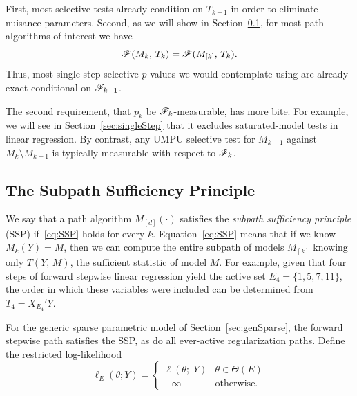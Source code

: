 \documentclass{article}
\begin{document}
First, most selective tests already condition on $T_{k-1}$ in order to eliminate nuisance parameters. Second, as we will show in Section~\ref{sec:SSP}, for most path algorithms of interest we have
\begin{equation}\label{eq:SSP}
\mathscr{F}(M_k, \, T_k) = \mathscr{F}(M_{[k]}, \, T_k).
\end{equation}
Thus, most single-step selective $p$-values we would contemplate using are already exact conditional on $\mathscr{F}_{k-1}$.

The second requirement, that $p_k$ be $\mathscr{F}_k$-measurable, has more bite. For example, we will see in Section~\ref{sec:singleStep} that it excludes saturated-model tests in linear regression. By contrast, any UMPU selective test for $M_{k-1}$ against $M_k\setminus M_{k-1}$ is typically measurable with respect to $\mathscr{F}_k$.


\subsection{The Subpath Sufficiency Principle}\label{sec:SSP}


We say that a path algorithm $M_{[d]}(\cdot)$ satisfies the {\em subpath sufficiency principle} (SSP) if~\eqref{eq:SSP} holds for every $k$. Equation~\eqref{eq:SSP} means that if we know $M_k(Y) = M$, then we can compute the entire subpath of models $M_{[k]}$ knowing only $T(Y, \, M)$, the sufficient statistic of model $M$. For example, given that four steps of forward stepwise linear regression yield the active set $E_4 = \{1,5,7,11\}$, the order in which these variables were included can be determined from $T_4 = X_{E_4}'Y$.

For the generic sparse parametric model of Section~\ref{sec:genSparse}, the forward stepwise path satisfies the SSP, as do all ever-active regularization paths. 
Define the restricted log-likelihood
\begin{equation}
\ell_E(\theta; Y) = \left\{\begin{matrix} 
    \ell(\theta; \;Y) & \theta \in \Theta(E)\\ 
    -\infty  & \mathrm{ otherwise.}\end{matrix}\right. 
\end{equation}
\end{document}
